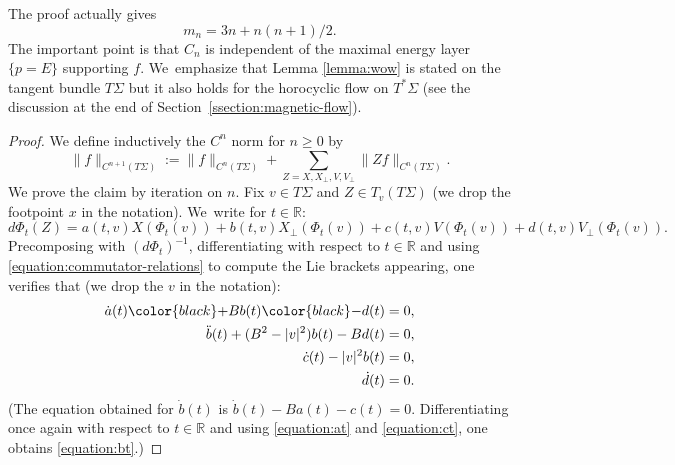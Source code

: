 \documentclass[JEP,XML,SOM,Unicode,published]{cedram}
\theoremstyle{plain}
\theoremstyle{definition}
\newcommand{\R}{\mathbb{R}}
\begin{document}
The proof actually gives
\[
m_n = 3n + n(n+1)/2.
\]
The important point is that $C_n$ is independent of the maximal energy layer $\{p=E\}$ supporting $f$. We~emphasize that Lemma \ref{lemma:wow} is stated on the tangent bundle $T\Sigma$ but it also holds for the horocyclic flow on $T^*\Sigma$ (see the discussion at the end of Section~\ref{ssection:magnetic-flow}).

\begin{proof}
We define inductively the $C^n$ norm for $n \geq 0$ by
\begin{equation}
\label{equation:definition-cn}
\|f\|_{C^{n+1}(T\Sigma)} := \|f\|_{C^n(T\Sigma)} + \sum_{Z = X,X_\perp,V,V_\perp} \|Zf\|_{C^n(T\Sigma)}.
\end{equation}
We prove the claim by iteration on $n$. Fix $v \in T\Sigma$ and $Z \in T_{v}(T\Sigma)$ (we drop the footpoint $x$ in the notation). We~write for $t \in \R$:
\[
d\Phi_t(Z) = a(t,v) X(\Phi_t(v)) + b(t,v) X_\perp(\Phi_t(v)) + c(t,v) V(\Phi_t(v)) + d(t,v) V_\perp(\Phi_t(v)).
\]
Precomposing with $(d\Phi_t)^{-1} $, differentiating with respect to $t \in \R$ and using \eqref{equation:commutator-relations} to compute the Lie brackets appearing, one verifies that (we drop the $v$ in the notation):
\begin{align}
\label{equation:at} \dot{a}(t) {\color{black}+} B b(t) {\color{black}-} d(t) &= 0, \\
\label{equation:bt} \ddot{b}(t)+(B^2-|v|^2)b(t)-Bd(t)&=0, \\
\label{equation:ct} \dot{c}(t)-|v|^2b(t)&=0, \\
\label{equation:dt} \dot{d}(t) &= 0.
\end{align}
(The equation obtained for $\dot{b}(t)$ is $\dot{b}(t) - Ba(t)-c(t) = 0$. Differentiating once again with respect to $t \in \R$ and using \eqref{equation:at} and \eqref{equation:ct}, one obtains \eqref{equation:bt}.)


\end{proof}
\end{document}
